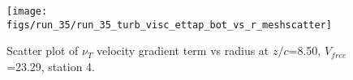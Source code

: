 \begin{figure}[H]
\centering
\texttt{[image: figs/run\_35/run\_35\_turb\_visc\_ettap\_bot\_vs\_r\_meshscatter]}
\caption{Scatter plot of $\nu_T$ velocity gradient term vs radius at $z/c$=8.50, $V_{free}$=23.29, station 4.}
\label{fig:run_35_turb_visc_ettap_bot_vs_r_meshscatter}
\end{figure}


